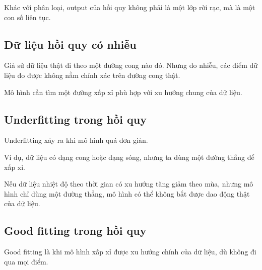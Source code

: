 Khác với phân loại, output của hồi quy không phải là một lớp rời rạc, mà là một con số liên tục.

\subsection{Dữ liệu hồi quy có nhiễu}

Giả sử dữ liệu thật đi theo một đường cong nào đó. Nhưng do nhiễu, các điểm dữ liệu đo được không nằm chính xác trên đường cong thật.

Mô hình cần tìm một đường xấp xỉ phù hợp với xu hướng chung của dữ liệu.

\subsection{Underfitting trong hồi quy}

Underfitting xảy ra khi mô hình quá đơn giản.

Ví dụ, dữ liệu có dạng cong hoặc dạng sóng, nhưng ta dùng một đường thẳng để xấp xỉ.

\begin{center}
\end{center}

\begin{vidu}
Nếu dữ liệu nhiệt độ theo thời gian có xu hướng tăng giảm theo mùa, nhưng mô hình chỉ dùng một đường thẳng, mô hình có thể không bắt được dao động thật của dữ liệu.
\end{vidu}

\subsection{Good fitting trong hồi quy}

Good fitting là khi mô hình xấp xỉ được xu hướng chính của dữ liệu, dù không đi qua mọi điểm.

